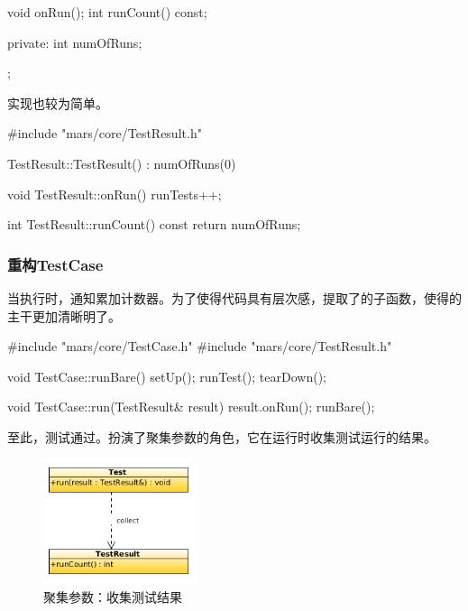 \begin{content}
\begin{leftbar}
\begin{c++}[caption={\ttfamily{include/mars/core/TestResult.h}}]
{  void onRun();
  int runCount() const;

private:
  int numOfRuns;
};
 \end{c++}
\end{leftbar}

实现也较为简单。

\begin{leftbar}
 \begin{c++}[caption={\ttfamily{src/mars/core/TestResult.cc}}]
#include "mars/core/TestResult.h"

TestResult::TestResult() : numOfRuns(0) {
}

void TestResult::onRun() {
  runTests++;
}

int TestResult::runCount() const {
  return numOfRuns;
}
 \end{c++}
\end{leftbar}

\subsubsection{重构TestCase}

当执行时，通知累加计数器。为了使得代码具有层次感，提取了的子函数，使得的主干更加清晰明了。

\begin{leftbar}
 \begin{c++}[caption={\ttfamily{src/mars/core/TestCase.cc}}]
#include "mars/core/TestCase.h"
#include "mars/core/TestResult.h"

void TestCase::runBare() {
  setUp();
  runTest();
  tearDown();
}

void TestCase::run(TestResult& result) {
  result.onRun();
  runBare();
}
 \end{c++}
\end{leftbar}

至此，测试通过。扮演了聚集参数的角色，它在运行时收集测试运行的结果。

\begin{figure}[H]
\centering
\includegraphics[width=0.4\textwidth]{figures/xunit/test-result.png}
\caption{聚集参数：收集测试结果}
 \label{fig:test-tree}
\end{figure}


\end{content}
